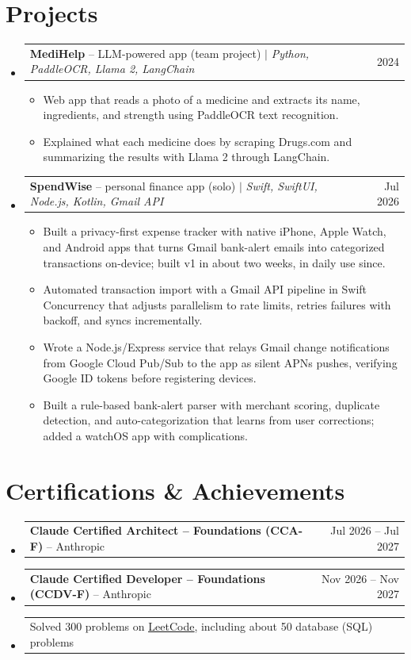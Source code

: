 \documentclass[a4paper,11pt]{article}
\makeatletter
\newcommand{\resumeItem}[1]{\item\small{#1\vspace{-1pt}}}
\newcommand{\resumeProjectHeading}[2]{
    \item
    \begin{tabularx}{0.97\textwidth}{@{}>{\raggedright\arraybackslash}X@{\hspace{0.75em}}r@{}}
      \small#1 & #2 \\
    \end{tabularx}\vspace{-3pt}
}
\newcommand{\resumeSubItemListStart}{\begin{itemize}[leftmargin=0.15in, label={}]}
\newcommand{\resumeSubItemListEnd}{\end{itemize}}
\newcommand{\resumeItemListStart}{\begin{itemize}[itemsep=2pt]}
\newcommand{\resumeItemListEnd}{\end{itemize}\vspace{-2pt}}
\makeatother
\begin{document}
\section{Projects}
  \resumeSubItemListStart

    \resumeProjectHeading
      {\textbf{MediHelp} -- LLM-powered app (team project) $|$ \emph{Python, PaddleOCR, Llama 2, LangChain}}{2024}
      \resumeItemListStart
        \resumeItem{Web app that reads a photo of a medicine and extracts its name, ingredients, and strength using PaddleOCR text recognition.}
        \resumeItem{Explained what each medicine does by scraping Drugs.com and summarizing the results with Llama 2 through LangChain.}
      \resumeItemListEnd

    \resumeProjectHeading
      {\textbf{SpendWise} -- personal finance app (solo) $|$ \emph{Swift, SwiftUI, Node.js, Kotlin, Gmail API}}{Jul 2026}
      \resumeItemListStart
        \resumeItem{Built a privacy-first expense tracker with native iPhone, Apple Watch, and Android apps that turns Gmail bank-alert emails into categorized transactions on-device; built v1 in about two weeks, in daily use since.}
        \resumeItem{Automated transaction import with a Gmail API pipeline in Swift Concurrency that adjusts parallelism to rate limits, retries failures with backoff, and syncs incrementally.}
        \resumeItem{Wrote a Node.js/Express service that relays Gmail change notifications from Google Cloud Pub/Sub to the app as silent APNs pushes, verifying Google ID tokens before registering devices.}
        \resumeItem{Built a rule-based bank-alert parser with merchant scoring, duplicate detection, and auto-categorization that learns from user corrections; added a watchOS app with complications.}
      \resumeItemListEnd

  \resumeSubItemListEnd

\section{Certifications \& Achievements}
  \resumeSubItemListStart
    \resumeProjectHeading
      {\textbf{Claude Certified Architect -- Foundations (CCA-F)} -- Anthropic}{Jul 2026 -- Jul 2027}
    \resumeProjectHeading
      {\textbf{Claude Certified Developer -- Foundations (CCDV-F)} -- Anthropic}{Nov 2026 -- Nov 2027}
    \resumeProjectHeading
      {Solved 300 problems on \href{https://leetcode.com/u/sAMurai7781/}{\underline{LeetCode}}, including about 50 database (SQL) problems}{}
  \resumeSubItemListEnd
\end{document}

